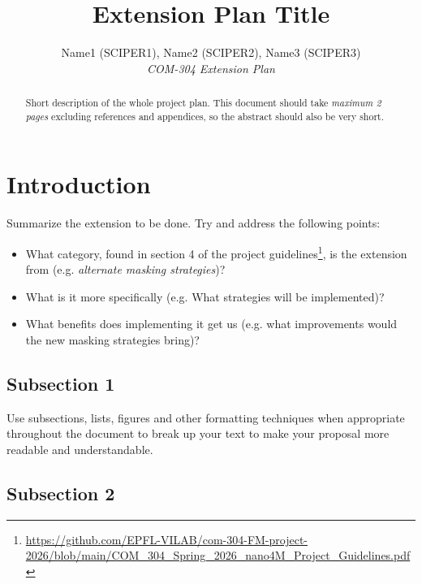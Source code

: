 \documentclass[10pt,conference,compsocconf]{IEEEtran}
\begin{document}
\title{Extension Plan Title}

\author{
  Name1 (SCIPER1), Name2 (SCIPER2), Name3 (SCIPER3)\\
  \textit{COM-304 Extension Plan}
}

\maketitle

\begin{abstract}
    Short description of the whole project plan. This document should take \textit{maximum 2 pages} excluding references and appendices, so the abstract should also be very short. 
 
\end{abstract}


\section{Introduction}
Summarize the extension to be done. Try and address the following points:

\begin{itemize}
    \item What category, found in section 4 of the project guidelines\footnote{\url{https://github.com/EPFL-VILAB/com-304-FM-project-2026/blob/main/COM_304_Spring_2026_nano4M_Project_Guidelines.pdf}}, is the extension from (e.g. \textit{alternate masking strategies})?
    \item What is it more specifically (e.g. What strategies will be implemented)?
    \item What benefits does implementing it get us (e.g. what improvements would the new masking strategies bring)?
\end{itemize}




\subsection{Subsection 1}

Use subsections, lists, figures and other formatting techniques when appropriate throughout the document to break up your text to make your proposal more readable and understandable.

\subsection{Subsection 2}
\end{document}
